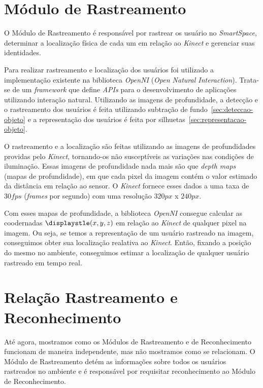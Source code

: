 \section{Módulo de Rastreamento}

	O Módulo de Rastreamento é responsável por rastrear os usuário no \textit{SmartSpace}, determinar a localização física de cada um em relação ao \textit{Kinect} e gerenciar suas identidades.

	Para realizar rastreamento e localização dos usuários foi utilizado a implementação existente na biblioteca \textit{OpenNI} (\textit{Open Natural Interaction}). Trata-se de um \textit{framework} que define \textit{APIs} para o desenvolvimento de aplicações utilizando interação natural. Utilizando as imagens de profundidade, a detecção e o rastreamento dos usuários é feita utilizando subtração de fundo~\ref{sec:deteccao-objeto} e a representação dos usuários é feita por silhuetas~\ref{sec:representacao-objeto}. 

	O rastreamento e a localização são feitas utilizando as imagens de profundidades providas pelo \textit{Kinect}, tornando-os não susceptíveis as variações nas condições de iluminação. Essas imagens de profundidade nada mais são que \textit{depth maps} (mapas de profundidade), em que cada pixel da imagem contém o valor estimado da distância em relação ao sensor. O \textit{Kinect} fornece esses dados a uma taxa de $\displaystyle 30 fps$ (\textit{frames} por segundo) com uma resolução $\displaystyle 320px$ x $\displaystyle 240px$.
	
	Com esses mapas de profundidade, a biblioteca \textit{OpenNI} consegue calcular as coodernadas $\displaystle (x,y,z)$ em relação ao \textit{Kinect} de qualquer pixel na imagem. Ou seja, se temos a representação de um usuário rastreado na imagem, conseguimos obter sua localização realativa ao \textit{Kinect}. Então, fixando a posição do mesmo no ambiente, conseguimos estimar a localização de qualquer usuário rastreado em tempo real.

\section{Relação Rastreamento e Reconhecimento}
\label{sec:rastreamento-reconheicmento}

	Até agora, mostramos como os Módulos de Rastreamento e de Reconhecimento funcionam de maneira independente, mas não mostramos como se relacionam. O Módulo de Rastreamento detém as informações sobre todos os usuários rastreados no ambiente e é responsável por requisitar reconhecimento ao Módulo de Reconhecimento.


